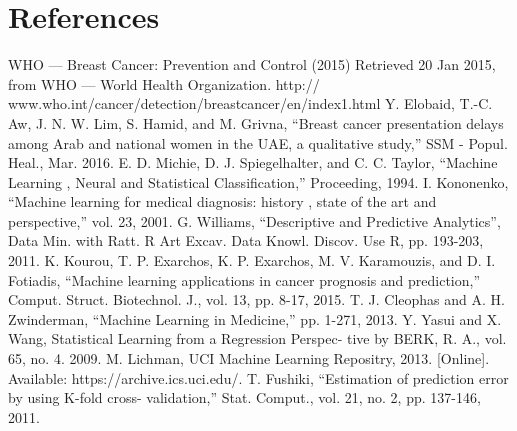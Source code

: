 \documentclass[conference,compsoc]{IEEEtran}
\begin{document}
\section{References}
\newline
[1] WHO — Breast Cancer: Prevention and Control (2015) Retrieved
20 Jan 2015, from WHO — World Health Organization. http://
www.who.int/cancer/detection/breastcancer/en/index1.html
\newline
[2] Y. Elobaid, T.-C. Aw, J. N. W. Lim, S. Hamid, and M. Grivna, “Breast
cancer presentation delays among Arab and national women in the UAE,
a qualitative study,” SSM - Popul. Heal., Mar. 2016.
\newline
[3] E. D. Michie, D. J. Spiegelhalter, and C. C. Taylor, “Machine Learning
, Neural and Statistical Classification,” Proceeding, 1994.
\newline
[4] I. Kononenko, “Machine learning for medical diagnosis: history , state
of the art and perspective,” vol. 23, 2001.
\newline
[5] G. Williams, “Descriptive and Predictive Analytics”, Data Min. with
Ratt. R Art Excav. Data Knowl. Discov. Use R, pp. 193-203, 2011.
\newline
[6] K. Kourou, T. P. Exarchos, K. P. Exarchos, M. V. Karamouzis, and
D. I. Fotiadis, “Machine learning applications in cancer prognosis and
prediction,” Comput. Struct. Biotechnol. J., vol. 13, pp. 8-17, 2015.
\newline
[7] T. J. Cleophas and A. H. Zwinderman, “Machine Learning in Medicine,”
pp. 1-271, 2013.
\newline
[8] Y. Yasui and X. Wang, Statistical Learning from a Regression Perspec-
tive by BERK, R. A., vol. 65, no. 4. 2009.
\newline
[9]M. Lichman, UCI Machine Learning Repositry, 2013. [Online]. Available: https://archive.ics.uci.edu/.
\newline
[10] T. Fushiki, “Estimation of prediction error by using K-fold cross-
validation,” Stat. Comput., vol. 21, no. 2, pp. 137-146, 2011.
%
%
\end{document}

